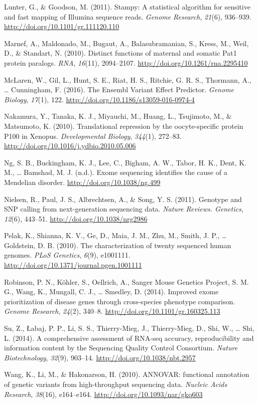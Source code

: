 \documentclass[12pt,twoside]{reedthesis}
\theoremstyle{definition}
\theoremstyle{definition}
\theoremstyle{remark}
\begin{document}
  \hypertarget{ref-Lunter2011}{}
  Lunter, G., \& Goodson, M. (2011). Stampy: A statistical algorithm for
  sensitive and fast mapping of Illumina sequence reads. \emph{Genome
  Research}, \emph{21}(6), 936--939.
  \url{http://doi.org/10.1101/gr.111120.110}
  
  \hypertarget{ref-Marnef2010}{}
  Marnef, A., Maldonado, M., Bugaut, A., Balasubramanian, S., Kress, M.,
  Weil, D., \& Standart, N. (2010). Distinct functions of maternal and
  somatic Pat1 protein paralogs. \emph{RNA}, \emph{16}(11), 2094--2107.
  \url{http://doi.org/10.1261/rna.2295410}
  
  \hypertarget{ref-McLaren2016}{}
  McLaren, W., Gil, L., Hunt, S. E., Riat, H. S., Ritchie, G. R. S.,
  Thormann, A., \ldots{} Cunningham, F. (2016). The Ensembl Variant Effect
  Predictor. \emph{Genome Biology}, \emph{17}(1), 122.
  \url{http://doi.org/10.1186/s13059-016-0974-4}
  
  \hypertarget{ref-Nakamura2010}{}
  Nakamura, Y., Tanaka, K. J., Miyauchi, M., Huang, L., Tsujimoto, M., \&
  Matsumoto, K. (2010). Translational repression by the oocyte-specific
  protein P100 in Xenopus. \emph{Developmental Biology}, \emph{344}(1),
  272--83. \url{http://doi.org/10.1016/j.ydbio.2010.05.006}
  
  \hypertarget{ref-Ng}{}
  Ng, S. B., Buckingham, K. J., Lee, C., Bigham, A. W., Tabor, H. K.,
  Dent, K. M., \ldots{} Bamshad, M. J. (n.d.). Exome sequencing identifies
  the cause of a Mendelian disorder. \url{http://doi.org/10.1038/ng.499}
  
  \hypertarget{ref-Nielsen2011}{}
  Nielsen, R., Paul, J. S., Albrechtsen, A., \& Song, Y. S. (2011).
  Genotype and SNP calling from next-generation sequencing data.
  \emph{Nature Reviews. Genetics}, \emph{12}(6), 443--51.
  \url{http://doi.org/10.1038/nrg2986}
  
  \hypertarget{ref-Pelak2010}{}
  Pelak, K., Shianna, K. V., Ge, D., Maia, J. M., Zhu, M., Smith, J. P.,
  \ldots{} Goldstein, D. B. (2010). The characterization of twenty
  sequenced human genomes. \emph{PLoS Genetics}, \emph{6}(9), e1001111.
  \url{http://doi.org/10.1371/journal.pgen.1001111}
  
  \hypertarget{ref-Robinson2014}{}
  Robinson, P. N., Köhler, S., Oellrich, A., Sanger Mouse Genetics
  Project, S. M. G., Wang, K., Mungall, C. J., \ldots{} Smedley, D.
  (2014). Improved exome prioritization of disease genes through
  cross-species phenotype comparison. \emph{Genome Research},
  \emph{24}(2), 340--8. \url{http://doi.org/10.1101/gr.160325.113}
  
  \hypertarget{ref-Su2014}{}
  Su, Z., Łabaj, P. P., Li, S. S., Thierry-Mieg, J., Thierry-Mieg, D.,
  Shi, W., \ldots{} Shi, L. (2014). A comprehensive assessment of RNA-seq
  accuracy, reproducibility and information content by the Sequencing
  Quality Control Consortium. \emph{Nature Biotechnology}, \emph{32}(9),
  903--14. \url{http://doi.org/10.1038/nbt.2957}
  
  \hypertarget{ref-Wang2010}{}
  Wang, K., Li, M., \& Hakonarson, H. (2010). ANNOVAR: functional
  annotation of genetic variants from high-throughput sequencing data.
  \emph{Nucleic Acids Research}, \emph{38}(16), e164--e164.
  \url{http://doi.org/10.1093/nar/gkq603}


\end{document}
